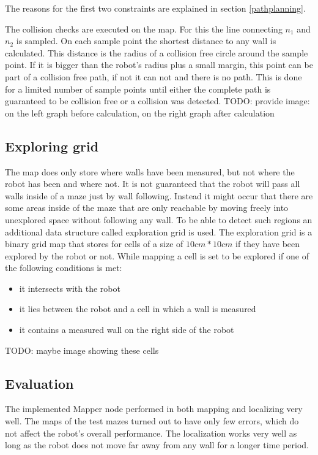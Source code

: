 The reasons for the first two constraints are explained in section \ref{pathplanning}. 

The collision checks are executed on the map. For this the line connecting $n_1$ and $n_2$ is sampled. On each sample point the shortest distance to any wall is calculated. This distance is the radius of a collision free circle around the sample point. If it is bigger than the robot's radius plus a small margin, this point can be part of a collision free path, if not it can not and there is no path. This is done for a limited number of sample points until either the complete path is guaranteed to be collision free or a collision was detected.
TODO: provide image: on the left graph before calculation, on the right graph after calculation

\subsection{Exploring grid}
The map does only store where walls have been measured, but not where the robot 
has been and where not. It is not guaranteed that the robot will pass all walls inside
of a maze just by wall following. Instead it might occur that there are some areas inside of the
maze that are only reachable by moving freely into unexplored space without following any wall.
To be able to detect such regions an additional data structure called exploration grid is used.
The exploration grid is a binary grid map that stores for cells of a size of
$10cm*10cm$ if they have been explored by the robot or not.
While mapping a cell is set to be explored if one of the following conditions is met:

\begin{itemize}
\item it intersects with the robot
\item it lies between the robot and a cell in which a wall is measured
\item it contains a measured wall on the right side of the robot
\end{itemize}

TODO: maybe image showing these cells



\subsection{Evaluation}

The implemented Mapper node performed in both mapping and localizing very well. The maps of the test mazes turned out to have only few errors, which do not affect the robot’s overall performance. The localization works very well as long as the robot does not move far away from any wall for a longer time period. 


